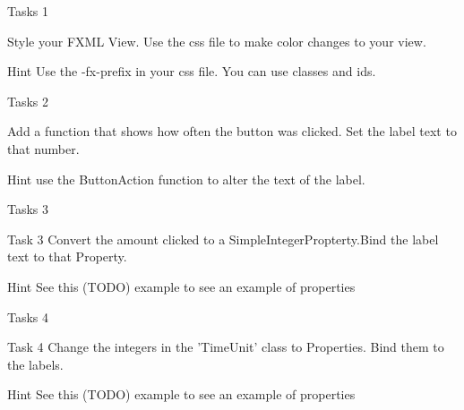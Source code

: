 \begin{frame}{Tasks 1}
\begin{block}
Style your FXML View. Use the css file to make color changes to your view. 
\end{block}
\pause
\begin{exampleblock}{Hint}
Use the -fx-prefix in your css file. You can use classes and ids. 
\end{exampleblock}
\end{frame}
\begin{frame}{Tasks 2}
\begin{block}
Add a function that shows how often the button was clicked. Set the label text to that number.
\end{block}
\pause
\begin{exampleblock}{Hint}
use the ButtonAction function to alter the text of the label.
\end{exampleblock}
\end{frame}
\begin{frame}{Tasks 3}
\begin{block}{Task 3}
Convert the amount clicked to a SimpleIntegerPropterty.Bind the label text to that Property. 
\end{block}
\pause
\begin{exampleblock}{Hint}
See this (TODO) example to see an example of properties 
\end{exampleblock}
\end{frame}
\begin{frame}{Tasks 4}
\begin{block}{Task 4}
Change the integers in the 'TimeUnit' class to Properties. Bind them to the labels.
\end{block}
\pause
\begin{exampleblock}{Hint}
See this (TODO) example to see an example of properties 
\end{exampleblock}
\end{frame}